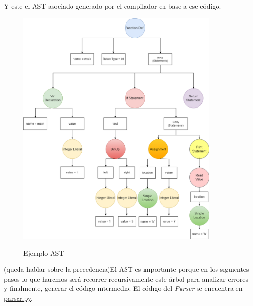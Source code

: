 \newpage Y este el AST asociado generado por el compilador en base a ese código.
\begin{figure}[h]
    \centering
    \includegraphics[width=0.9\textwidth,keepaspectratio]{img/asttree_latexexample.png} 
    \parbox{\linewidth}{\centering Ejemplo AST}
    \label{fig:mi_imagen}
\end{figure}

\newpage
(queda hablar sobre la precedencia)El AST es importante porque en los siguientes pasos lo que haremos será recorrer recursivamente este árbol para analizar errores y finalmente, generar el código intermedio. El código del \textit{Parser} se encuentra en \href{https://github.com/domingoUnican/TFGPedroCastro/blob/main/code/compilerGoneFSR/gone/parser.py}{parser.py}.
